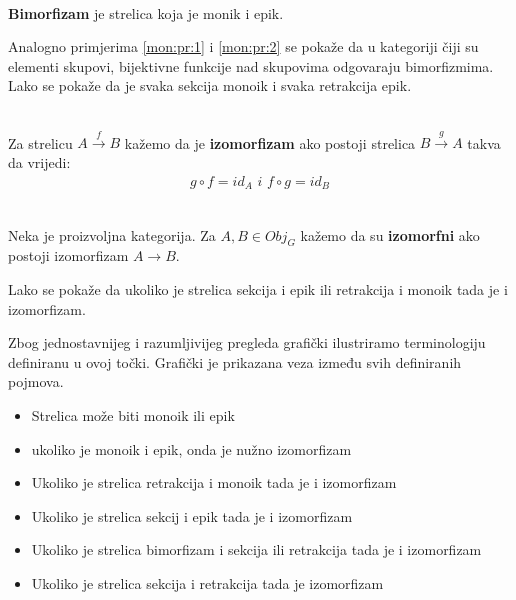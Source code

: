     \begin{definition}\ \\
    
    \noindent \textbf{Bimorfizam} je strelica koja je monik i epik.\\
    \end{definition}
    Analogno primjerima \ref{mon:pr:1} i \ref{mon:pr:2} se pokaže da u kategoriji čiji su elementi skupovi, bijektivne funkcije nad skupovima odgovaraju bimorfizmima.
    Lako se pokaže da je svaka sekcija monoik i svaka retrakcija epik.
    
    \begin{definition}\ \\
    
    \noindent Za strelicu $A \xrightarrow{f} B$ kažemo da je \textbf{izomorfizam} ako
    postoji strelica $B \xrightarrow{g} A$ takva da vrijedi:
      \begin{align*}
        g \circ f = id_A \,\, i \,\, f\circ g = id_B
      \end{align*}
    \end{definition}
    
    \begin{definition}\ \\
    
    \noindent Neka je  proizvoljna kategorija. Za $A, B \in Obj_G$ kažemo da su \textbf{izomorfni} ako postoji izomorfizam
    $A \xrightarrow{} B$.\\
    \end{definition}

    Lako se pokaže da ukoliko je strelica sekcija i epik ili retrakcija i
    monoik tada je i izomorfizam.

    Zbog jednostavnijeg i razumljivijeg pregleda grafički ilustriramo terminologiju definiranu u ovoj točki. Grafički je prikazana veza između svih definiranih pojmova.
    \begin{itemize}
      \item Strelica može biti monoik ili epik
      \item ukoliko je monoik i epik, onda je nužno izomorfizam
      \item Ukoliko je strelica retrakcija i monoik tada je i izomorfizam
      \item Ukoliko je strelica sekcij i epik tada je i izomorfizam
      \item Ukoliko je strelica bimorfizam i sekcija ili retrakcija tada je i izomorfizam
      \item Ukoliko je strelica sekcija i retrakcija tada je izomorfizam
    \end{itemize}
    
